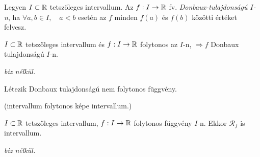 \documentclass[a4paper,11.5pt]{article}
\begin{document}
	\begin{definition}
		Legyen $I\subset\mathbb{R}$ tetszőleges intervallum. Az $f: I\to\mathbb{R}$ fv. \textit{Donbaux-tulajdonságú $I$-n}, ha $\forall a, b \in I, \quad a<b$ esetén az $f$ minden $f(a)$ és $f(b)$ közötti értéket felvesz.
	\end{definition}
	\begin{theorem}
		$I\subset\mathbb{R}$ tetszőleges intervallum és $f:I\to\mathbb{R} $ folytonos az $I$-n, $ \Rightarrow f$ Donbaux tulajdonságú $I$-n.
		\medskip
		
		\textit{biz nélkül.}
		\begin{note}
			Létezik Donbaux tulajdonságú nem folytonos függvény.
		\end{note}
	\end{theorem}
	\begin{theorem}
		(intervallum folytonos képe intervallum.)
		
		$I\subset \mathbb{R}$ tetszőleges intervallum, $f:I\to\mathbb{R}$ folytonos függvény $I$-n. Ekkor $\mathcal{R}_f$ is intervallum.
		\medskip
		
		\textit{biz nélkül.}
	\end{theorem}
\end{document}
